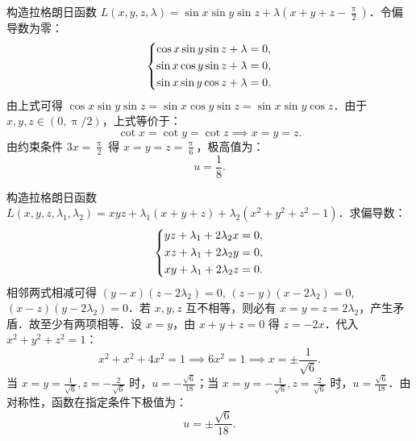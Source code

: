\begin{solution}
    构造拉格朗日函数 $L(x, y, z, \lambda) = \sin x \sin y \sin z + \lambda \left( x + y + z - \frac{\uppi}{2} \right)$．令偏导数为零：
    \begin{equation}
        \begin{dcases}
            \cos x \sin y \sin z + \lambda = 0, \\
            \sin x \cos y \sin z + \lambda = 0, \\
            \sin x \sin y \cos z + \lambda = 0.
        \end{dcases}
    \end{equation}
    由上式可得 $\cos x \sin y \sin z = \sin x \cos y \sin z = \sin x \sin y \cos z$．由于 $x, y, z \in (0, \uppi/2)$，上式等价于：
    \begin{equation}
        \cot x = \cot y = \cot z \implies x = y = z.
    \end{equation}
    由约束条件 $3x = \frac{\uppi}{2}$ 得 $x = y = z = \frac{\uppi}{6}$，极高值为：
    \begin{equation}
        \boxed{u = \frac{1}{8}}.
    \end{equation}


    构造拉格朗日函数 $L(x, y, z, \lambda_1, \lambda_2) = x y z + \lambda_{1}(x + y + z) + \lambda_{2}(x^{2} + y^{2} + z^{2} - 1)$．求偏导数：
    \begin{equation}
        \begin{dcases}
            y z + \lambda_{1} + 2 \lambda_{2} x = 0, \\
            x z + \lambda_{1} + 2 \lambda_{2} y = 0, \\
            x y + \lambda_{1} + 2 \lambda_{2} z = 0.
        \end{dcases}
    \end{equation}
    相邻两式相减可得 $(y - x)(z - 2 \lambda_{2}) = 0$, $(z - y)(x - 2 \lambda_{2}) = 0$, $(x - z)(y - 2 \lambda_{2}) = 0$．若 $x, y, z$ 互不相等，则必有 $x = y = z = 2 \lambda_{2}$，产生矛盾．故至少有两项相等．设 $x = y$，由 $x + y + z = 0$ 得 $z = -2x$．代入 $x^{2} + y^{2} + z^{2} = 1$：
    \begin{equation}
        x^{2} + x^{2} + 4x^{2} = 1 \implies 6x^{2} = 1 \implies x = \pm \frac{1}{\sqrt{6}}.
    \end{equation}
    当 $x = y = \frac{1}{\sqrt{6}}, z = -\frac{2}{\sqrt{6}}$ 时，$u = -\frac{\sqrt{6}}{18}$；当 $x = y = -\frac{1}{\sqrt{6}}, z = \frac{2}{\sqrt{6}}$ 时，$u = \frac{\sqrt{6}}{18}$．由对称性，函数在指定条件下极值为：
    \begin{equation}
        \boxed{u = \pm \frac{\sqrt{6}}{18}}.
    \end{equation}
\end{solution}


